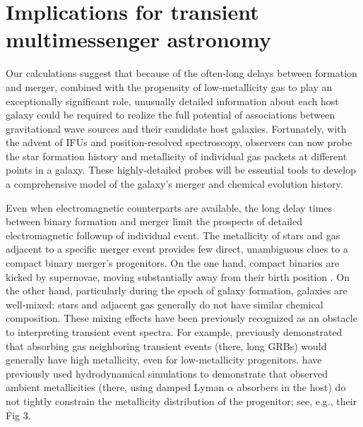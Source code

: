 \documentclass[nofootinbib,twocolumn,prd]{emulateapj}
\begin{document}
\section{Implications for transient multimessenger astronomy}
\label{sec:Discussion}

Our calculations suggest that because of the often-long delays between formation and merger, combined with the
propensity of low-metallicity gas to play an exceptionally significant role, unusually detailed information about each host galaxy could be required to realize the full
potential of  associations between gravitational wave sources and their candidate host galaxies.
%
Fortunately,  with the advent of
IFUs and position-resolved spectroscopy, observers can now probe the star formation history and metallicity of
individual gas packets at different points in a galaxy.  
%
These highly-detailed probes will be essential tools to develop a comprehensive model of the galaxy's merger and
chemical evolution history.    

Even when electromagnetic counterparts are available, the long delay times between binary formation and merger limit
the prospects of detailed electromagnetic followup of individual event. 
The metallicity of stars and gas adjacent to a specific merger event provides
few direct, unambiguous clues to a compact binary merger's progenitors.  
On the one hand, compact binaries are kicked by supernovae, moving substantially away from their birth position
\cite{2013ApJ...776...18F,2014ARAA..52...43B}. 
On the other hand, particularly during the epoch of galaxy formation, galaxies are well-mixed: stars and adjacent gas generally do not have
similar chemical composition.  
These mixing effects have been previously recognized as an obstacle to interpreting transient event spectra.  For
example,   \cite{2010MNRAS.402.1523P} previously demonstrated that absorbing gas neighboring transient events (there, long GRBs)
would generally have high metallicity, even for low-metallicity progenitors.   
%
\citet{2010MNRAS.402.1523P} have previously used hydrodynamical simulations to demonstrate that observed ambient
metallicities (there, using damped Lyman $\alpha$ absorbers in the host) do not tightly constrain the metallicity
distribution of the progenitor; see, e.g., their Fig 3.
%
\end{document}
